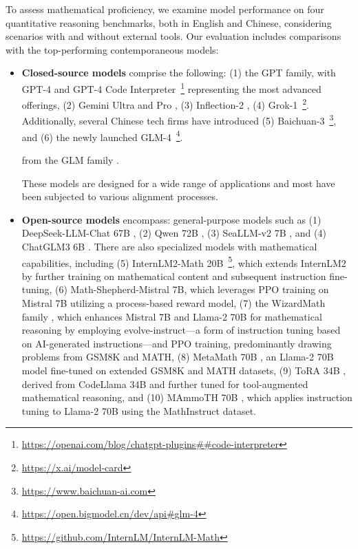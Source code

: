 \begin{itemize}[topsep=0pt]
To assess mathematical proficiency, we examine model performance on four quantitative reasoning benchmarks, both in English and Chinese, considering scenarios with and without external tools. Our evaluation includes comparisons with the top-performing contemporaneous models:

\begin{itemize}[topsep=0pt]
    \item \textbf{Closed-source models} comprise the following: (1) the GPT family, with GPT-4 \citep{gpt4} and GPT-4 Code Interpreter~\footnote{\url{https://openai.com/blog/chatgpt-plugins\#\#code-interpreter}} representing the most advanced offerings, (2) Gemini Ultra and Pro \citep{gemini}, (3) Inflection-2 \citep{inflection-2}, (4) Grok-1~\footnote{\url{https://x.ai/model-card}}. Additionally, several Chinese tech firms have introduced (5) Baichuan-3~\footnote{\url{https://www.baichuan-ai.com}}, and (6) the newly launched GLM-4~\footnote{\url{https://open.bigmodel.cn/dev/api\#glm-4}}.

    from the GLM family \citep{glm}.

These models are designed for a wide range of applications and most have been subjected to various alignment processes.

\item \textbf{Open-source models} encompass: general-purpose models such as (1) DeepSeek-LLM-Chat 67B \citep{deepseek-llm}, (2) Qwen 72B \citep{qwen}, (3) SeaLLM-v2 7B \citep{seallm}, and (4) ChatGLM3 6B \citep{chatglm3}. There are also specialized models with mathematical capabilities, including (5) InternLM2-Math 20B~\footnote{\url{https://github.com/InternLM/InternLM-Math}}, which extends InternLM2 by further training on mathematical content and subsequent instruction fine-tuning, (6) Math-Shepherd-Mistral 7B, which leverages PPO training \citep{schulman2017proximal} on Mistral 7B \citep{mistral} utilizing a process-based reward model, (7) the WizardMath family \citep{wizardmath}, which enhances Mistral 7B and Llama-2 70B \citep{llama2} for mathematical reasoning by employing evolve-instruct—a form of instruction tuning based on AI-generated instructions—and PPO training, predominantly drawing problems from GSM8K and MATH, (8) MetaMath 70B \citep{metamath}, an Llama-2 70B model fine-tuned on extended GSM8K and MATH datasets, (9) ToRA 34B \cite{tora}, derived from CodeLlama 34B and further tuned for tool-augmented mathematical reasoning, and (10) MAmmoTH 70B \citep{MathInstruct}, which applies instruction tuning to Llama-2 70B using the MathInstruct dataset.


\end{itemize}
\end{itemize}
